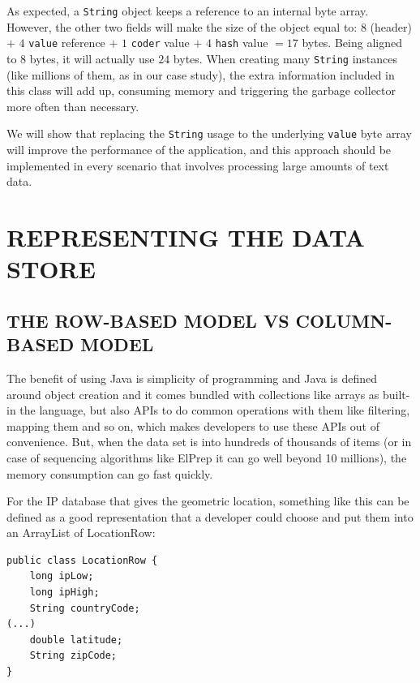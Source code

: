 \documentclass[a4paper,twoside]{article}
\begin{document}
As expected, a \texttt{String} object keeps a reference to an internal byte array.
However, the other two fields will make the size of the object equal to: $8$ (header) $+$ $4$ \texttt{value} reference $+$ $1$  \texttt{coder} value $+$ $4$ \texttt{hash} value $= 17$ bytes.
Being aligned to $8$ bytes, it will actually use $24$ bytes.
When creating many \texttt{String} instances (like millions of them, as in our case study), the extra information included in this class will add up, consuming memory and  triggering the garbage collector more often than necessary. 

We will show that replacing the \texttt{String} usage to the underlying \texttt{value} byte array will improve the performance of the application, and this approach should be implemented in every scenario that involves processing large amounts of text data.

\section{\uppercase{Representing the Data Store}}
\label{sec:model}

\subsection{\uppercase{The Row-Based Model vs Column-Based Model}}
\label{subsec:column}

The benefit of using Java is simplicity of programming and Java is defined around object creation and it comes bundled with collections like arrays as built-in the language, but also APIs to do common operations with them like filtering, mapping them and so on, which makes developers to use these APIs out of convenience.
But, when the data set is into hundreds of thousands of items (or in case of sequencing algorithms like ElPrep it can go well beyond 10 millions), the memory consumption can go fast quickly.

For the IP database that gives the geometric location, something like this can be defined as a good representation that a developer could choose and put them into an ArrayList of LocationRow:

\begin{small}
\begin{verbatim}
public class LocationRow {
    long ipLow;
    long ipHigh;
    String countryCode;
(...)
    double latitude;
    String zipCode;
}
\end{verbatim}
\end{small}
\end{document}

